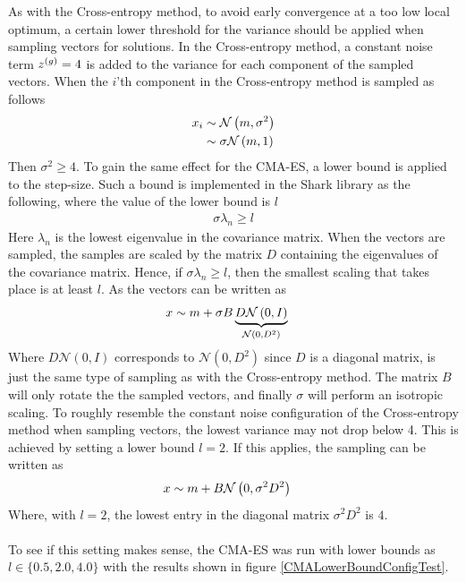 As with the Cross-entropy method, to avoid early convergence
at a too low local optimum, a 
certain lower threshold for the variance should be applied when 
sampling vectors for solutions. In the Cross-entropy method, a constant 
noise term $z^{(g)} = 4$ is added to the variance for each component
of the sampled vectors. When the $i$'th component in the Cross-entropy method is
sampled as follows
\begin{align*}
x_i &\sim \mathcal{N}\left(m, \sigma^{2}\right)\\
              &\sim \sigma \mathcal{N}\left(m, 1\right)
\end{align*}
Then $\sigma^{2} \geq 4$. To gain the same effect for the CMA-ES, a lower bound 
is applied to the step-size. Such a bound is implemented in the Shark library
as the following, where the value of the lower bound is $l$
\begin{align*}
\sigma  \lambda_n \geq l
\end{align*}
Here $\lambda_n$ is the lowest eigenvalue in the covariance matrix. 
When the vectors are sampled, the samples are scaled by the matrix $D$
containing the eigenvalues of the covariance matrix. 
Hence, if $\sigma \lambda_n \geq l$, then the smallest scaling
that takes place is at least $l$. As the vectors can be written 
as
\begin{align*}
x &\sim m + \sigma B 
\underbrace{D \mathcal{N}\left(0, I \right)}_{\mathcal{N}\left(0, D^2 \right)}
\end{align*}
Where $D \mathcal{N}\left(0, I \right)$ corresponds to 
$\mathcal{N}\left(0, D^2 \right)$ since $D$ is a diagonal
matrix, is just the same type of sampling as with the Cross-entropy method. 
The matrix $B$ will only rotate the the sampled vectors, and finally
$\sigma$ will perform an isotropic scaling. 
To roughly resemble the constant noise configuration of the Cross-entropy method
when sampling vectors, the lowest variance may not drop below 4. 
This is achieved by setting a lower bound $l=2$. If this applies,
the sampling can be written as
\begin{align*}
x &\sim m +  B \mathcal{N}\left(0, \sigma^2 D^2 \right)
\end{align*}
Where, with $l=2$, the lowest entry in the diagonal matrix $\sigma^2 D^2$
is $4$.\\
\\
To see if this setting makes sense, the CMA-ES was run with lower bounds as 
$l \in \{0.5, 2.0, 4.0\}$ with the results shown in figure \ref{CMALowerBoundConfigTest}.

